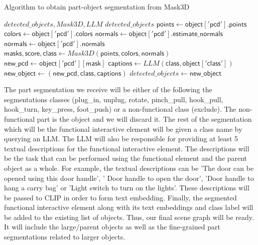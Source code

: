 \begin{Algorithmus} %
  \caption{Algorithm to obtain part-object segmentation from Mask3D}
  \label{alg:integrateMask3D}
  \begin{algorithmic}
    \Require $detected\_objects, Mask3D, LLM$
    \Ensure $detected\_objects$
        \State $\mathsf{points} \gets \mathsf{object['pcd'].points}$
        \State $\mathsf{colors} \gets \mathsf{object['pcd'].colors}$
            \State $\mathsf{normals} \gets \mathsf{object['pcd'].estimate\_normals}$
        \Else
            \State $\mathsf{normals} \gets \mathsf{object['pcd'].normals}$
        \EndIf
        \State $\mathsf{masks, score, class} \gets Mask3D(\mathsf{points,colors,normals})$
        \State $\mathsf{new\_pcd} \gets  \mathsf{object['pcd'][mask]}$
        \State $\mathsf{captions} \gets LLM(\mathsf{class, object['class']})$
        \State $\mathsf{new\_object} \gets  \mathsf{(new\_pcd, class, captions)}$
        \State $detected\_objects \gets  \mathsf{new\_object}$
    \EndFor
  \end{algorithmic}
\end{Algorithmus}

The part segmentation we receive will be either of the following the segmentations classes (plug\_in, unplug, rotate, pinch\_pull, hook\_pull, 
hook\_turn, key\_press, foot\_push) or a non-functional class (exclude). The non-functional part is the object and we will discard it. The rest of the 
segmentation which will be the functional interactive element will be given a class name by querying an LLM. The LLM will also be responsible for providing
at least 5 textual descriptions for the functional interactive element. The descriptions will be the task that can be performed using the 
functional element and the parent object as a whole. For example, the textual descriptions can be 'The door can be opened using this door handle', '
Door handle to open the door', 'Door handle to hang a carry bag' or 'Light switch to turn on the lights'. These descriptions will be passed to CLIP
in order to form text embedding. Finally, the segmented functional interactive element along with its text embeddings and class label will be added
to the existing list of objects. Thus, our final scene graph will be ready. It will include the large/parent objects as well as the fine-grained
part segmentations related to larger objects. 

